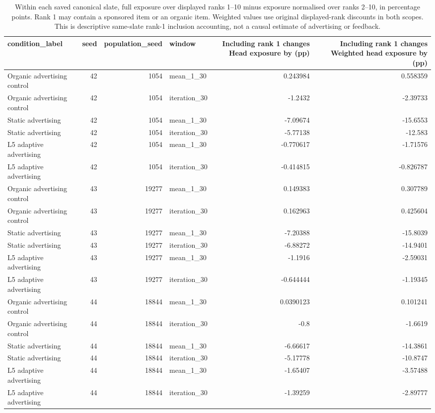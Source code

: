 \begin{table}[htbp!]
\centering
\small
\setlength{\tabcolsep}{3pt}
\renewcommand{\arraystretch}{1.1}
\begin{tabular}{lrrlrr}
\hline
condition\_label & seed & population\_seed & window & Including rank 1 changes Head exposure by (pp) & Including rank 1 changes Weighted head exposure by (pp) \\
\hline
Organic advertising control & 42 & 1054 & mean\_1\_30 & 0.243984 & 0.558359 \\
Organic advertising control & 42 & 1054 & iteration\_30 & -1.2432 & -2.39733 \\
Static advertising & 42 & 1054 & mean\_1\_30 & -7.09674 & -15.6553 \\
Static advertising & 42 & 1054 & iteration\_30 & -5.77138 & -12.583 \\
L5 adaptive advertising & 42 & 1054 & mean\_1\_30 & -0.770617 & -1.71576 \\
L5 adaptive advertising & 42 & 1054 & iteration\_30 & -0.414815 & -0.826787 \\
Organic advertising control & 43 & 19277 & mean\_1\_30 & 0.149383 & 0.307789 \\
Organic advertising control & 43 & 19277 & iteration\_30 & 0.162963 & 0.425604 \\
Static advertising & 43 & 19277 & mean\_1\_30 & -7.20388 & -15.8039 \\
Static advertising & 43 & 19277 & iteration\_30 & -6.88272 & -14.9401 \\
L5 adaptive advertising & 43 & 19277 & mean\_1\_30 & -1.1916 & -2.59031 \\
L5 adaptive advertising & 43 & 19277 & iteration\_30 & -0.644444 & -1.19345 \\
Organic advertising control & 44 & 18844 & mean\_1\_30 & 0.0390123 & 0.101241 \\
Organic advertising control & 44 & 18844 & iteration\_30 & -0.8 & -1.6619 \\
Static advertising & 44 & 18844 & mean\_1\_30 & -6.66617 & -14.3861 \\
Static advertising & 44 & 18844 & iteration\_30 & -5.17778 & -10.8747 \\
L5 adaptive advertising & 44 & 18844 & mean\_1\_30 & -1.65407 & -3.57488 \\
L5 adaptive advertising & 44 & 18844 & iteration\_30 & -1.39259 & -2.89777 \\
\hline
\end{tabular}
\caption{Within each saved canonical slate, full exposure over displayed ranks 1--10 minus exposure normalised over ranks 2--10, in percentage points. Rank 1 may contain a sponsored item or an organic item. Weighted values use original displayed-rank discounts in both scopes. This is descriptive same-slate rank-1 inclusion accounting, not a causal estimate of advertising or feedback.}
\label{chap:results:tab:rq1_advertising_rank1_inclusion_accounting}
\end{table}
